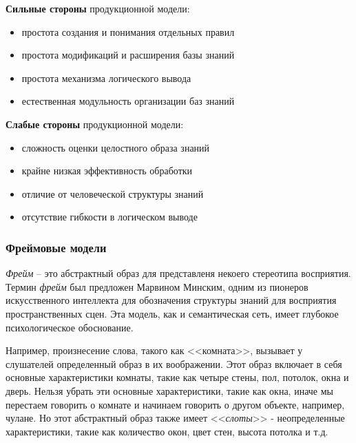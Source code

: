 \textbf{Сильные стороны} продукционной модели:
\begin{itemize}
    \item простота создания и понимания отдельных правил
    \item простота модификаций и расширения базы знаний
    \item простота механизма логического вывода
    \item естественная модульность организации баз знаний
\end{itemize}

\textbf{Слабые стороны} продукционной модели:
\begin{itemize}
    \item сложность оценки целостного образа знаний
    \item крайне низкая эффективность обработки
    \item отличие от человеческой структуры знаний
    \item отсутствие гибкости в логическом выводе \cite[с.~15-16]{Model_Baryshev}
\end{itemize}

\subsubsection{Фреймовые модели}

\textit{Фрейм} -- это абстрактный образ для представленя некоего стереотипа восприятия. Термин \textit{фрейм} был предложен Марвином Минским, одним из пионеров искусственного интеллекта для обозначения структуры знаний для восприятия пространственных сцен. Эта модель, как и семантическая сеть, имеет глубокое психологическое обоснование.

Например, произнесение слова, такого как <<комната>>, вызывает у слушателей определенный образ в их воображении. Этот образ включает в себя основные характеристики комнаты, такие как четыре стены, пол, потолок, окна и дверь. Нельзя убрать эти основные характеристики, такие как окна, иначе мы перестаем говорить о комнате и начинаем говорить о другом объекте, например, чулане. Но этот абстрактный образ также имеет <<\textit{слоты}>> - неопределенные характеристики, такие как количество окон, цвет стен, высота потолка и т.д.

